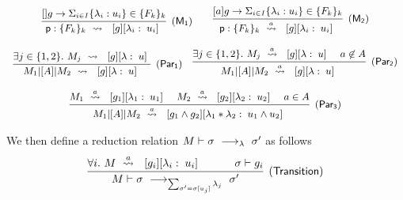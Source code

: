\begin{displaymath}\small
  \begin{array}{ccc}
    \infer[\mathsf{(M_1)}]
    { {\role{p}:\{F_k\}_k} \prismred{}\lab{g}{\lambda_i}{u_i} }
    {\command {}g\lambda u\in\{F_k\}_k}
    \qquad
    \infer[\mathsf{(M_2)}]
    { {\role{p}:\{F_k\}_k} \prismred{a}\lab{g}{\lambda_i}{u_i} }
    {\command ag\lambda u\in\{F_k\}_k}
    \\\\
    \infer[\mathsf{(Par_1)}]
    {M_1\ppp A M_2\prismred{}\lab g\lambda u }
    {
    \exists j\in\{1,2\}.\ 
    M_j\prismred{}\lab g\lambda u}
    \quad
    \infer[\mathsf{(Par_2)}]
    {M_1\ppp A M_2\prismred{a}\lab g\lambda u }
    {
    \exists j\in\{1,2\}.\ 
    M_j\prismred{a}\lab g\lambda u
    & a\not\in A
    }
    \\\\
    \infer[\mathsf{(Par_3)}]
    {M_1\ppp A M_2\prismred{a}\lab{g_1\land g_2}{\lambda_1*\lambda_2}{u_1\land u_2} }
    {
    M_1\prismred{a}\lab{g_1}{\lambda_1}{u_1} 
    & M_2\prismred{a}\lab{g_2}{\lambda_2}{u_2} 
                 & a\in A}
  \end{array}
\end{displaymath}

We then define a reduction relation $M\vdash \sigma\ \longrightarrow_{\lambda}\ \sigma'$ as follows
$$
\infer[\mathsf{(Transition)}]
{
  M\vdash \sigma\red{\sum_{\sigma'= \sigma[u_j]} \lambda_j}\sigma'
}
{
  \forall i.\ M\prismred{a}\lab {g_i}{\lambda_i}{u_i}
  \quad&\quad
  \sigma\vdash g_i
}
$$

